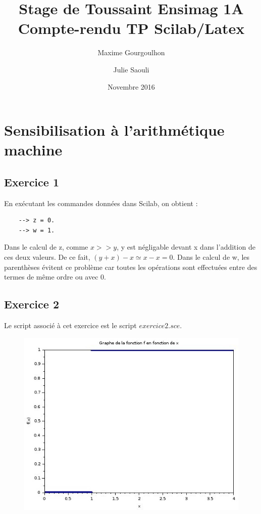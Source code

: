 \documentclass[a4paper,11pt]{article}
\title{Stage de Toussaint Ensimag 1A \\ Compte-rendu TP Scilab/Latex}
\author{Maxime Gourgoulhon \and Julie Saouli}
\date{Novembre 2016}
\begin{document}
\maketitle

\section{Sensibilisation à l'arithmétique machine}

\subsection*{Exercice 1}
	En exécutant les commandes données dans Scilab, on obtient :
	\begin{verbatim}
	--> z = 0.
	--> w = 1.
	\end{verbatim}
	
	Dans le calcul de z, comme $x >> y$, y est négligable devant x dans l'addition de ces deux valeurs. De ce fait, $(y+x)-x \simeq x - x = 0$.
	Dans le calcul de w, les parenthèses évitent ce problème car toutes les opérations sont effectuées entre des termes de même ordre ou avec 0.

	
\subsection*{Exercice 2}
	Le script associé à cet exercice est le script $exercice2.sce$.

\begin{figure}[H]
	\centering
	\includegraphics[scale=0.5]{graphes/exercice2.jpg}	
\end{figure}
\end{document}
